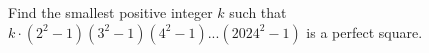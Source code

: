 Find the smallest positive integer $k$ such that $k \cdot(2^2-1)(3^2-1)(4^2-1)...(2024^2-1)$ is a perfect square.
